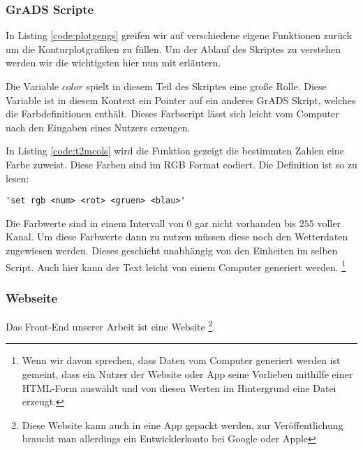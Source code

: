 \subsubsection*{GrADS Scripte}


In Listing \ref{code:plotgengs} greifen wir auf verschiedene eigene Funktionen zurück um die Konturplotgrafiken zu füllen. Um der Ablauf des Skriptes zu verstehen werden wir die wichtigsten hier nun mit erläutern.

Die Variable $color$ spielt in diesem Teil des Skriptes eine große Rolle.
Diese Variable ist in diesem Kontext ein Pointer auf ein anderes GrADS Skript,
welches die Farbdefinitionen enthält.
Dieses Farbscript lässt sich leicht vom Computer nach den Eingaben eines Nutzers erzeugen.

In Listing \ref{code:t2mcols} wird die Funktion gezeigt die bestimmten Zahlen eine Farbe zuweist.
Diese Farben sind im RGB Format codiert.
Die Definition ist so zu lesen:

\begin{lstlisting}[language=grads]
	'set rgb <num> <rot> <gruen> <blau>'
\end{lstlisting}

Die Farbwerte sind in einem Intervall von $0$ gar nicht vorhanden bis $255$ voller Kanal.
Um diese Farbwerte dann zu nutzen müssen diese noch den Wetterdaten zugewiesen werden.
Dieses geschieht unabhängig von den Einheiten im selben Script.
Auch hier kann der Text leicht von einem Computer generiert werden.
\footnote{Wenn wir davon sprechen, dass Daten vom Computer generiert werden ist gemeint, dass ein Nutzer der Website oder App seine Vorlieben mithilfe einer HTML-Form auswählt und von diesen Werten im Hintergrund eine Datei erzeugt.}


\subsubsection*{Webseite}
Das Front-End unserer Arbeit ist eine Website
\footnote{Diese Website kann auch in eine App gepackt werden, zur Veröffentlichung braucht man allerdings ein Entwicklerkonto bei Google oder Apple}.

